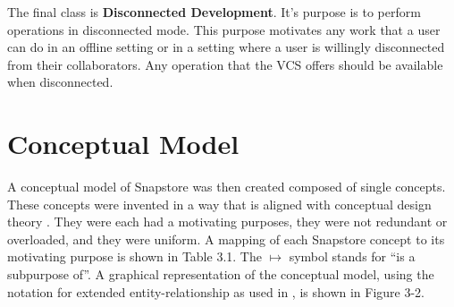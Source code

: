 The final class is \textbf{Disconnected Development}. It's purpose is to perform operations in disconnected mode. This purpose motivates any work that a user can do in an offline setting or in a setting where a user is willingly disconnected from their collaborators. Any operation that the VCS offers should be available when disconnected.

\section{Conceptual Model}

A conceptual model of Snapstore was then created composed of single concepts. These concepts were invented in a way that is aligned with conceptual design theory \cite{Jackson}. They were each had a motivating purposes, they were not redundant or overloaded, and they were uniform. A mapping of each Snapstore concept to its motivating purpose is shown in Table 3.1. The $\mapsto$ symbol stands for ``is a subpurpose of''. A graphical representation of the conceptual model, using the notation for extended entity-relationship as used in \cite{Jackson}, is shown in Figure 3-2.

\vspace{6mm}

